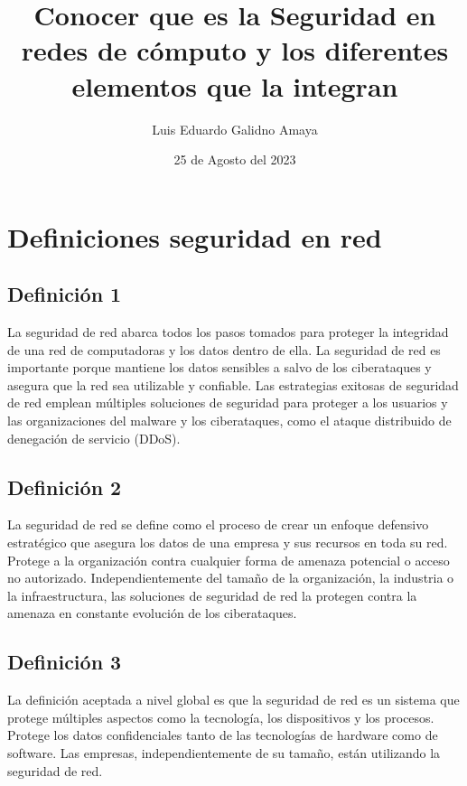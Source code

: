 \documentclass[11pt]{article}
\author{Luis Eduardo Galidno Amaya}
\date{25 de Agosto del 2023}
\title{Conocer que es la Seguridad en \\
redes de cómputo y los diferentes elementos que la integran}
\begin{document}


\section{Definiciones seguridad en red}
\label{sec:org6c4bf58}
\subsection{Definición 1}
\label{sec:orgaa7166d}
\autocite{barney_lutkevich_2022}  La seguridad de red abarca todos los pasos tomados para proteger la integridad de una red de computadoras y los datos dentro de ella. La seguridad de red es importante porque mantiene los datos sensibles a salvo de los ciberataques y asegura que la red sea utilizable y confiable. Las estrategias exitosas de seguridad de red emplean múltiples soluciones de seguridad para proteger a los usuarios y las organizaciones del malware y los ciberataques, como el ataque distribuido de denegación de servicio (DDoS).

\subsection{Definición 2}
\label{sec:orgd6f4f01}
\autocite{Prabhu_24_2021} La seguridad de red se define como el proceso de crear un enfoque defensivo estratégico que asegura los datos de una empresa y sus recursos en toda su red. Protege a la organización contra cualquier forma de amenaza potencial o acceso no autorizado. Independientemente del tamaño de la organización, la industria o la infraestructura, las soluciones de seguridad de red la protegen contra la amenaza en constante evolución de los ciberataques.

\subsection{Definición 3}
\label{sec:org4b47779}
\autocite{Naz_2023} La definición aceptada a nivel global es que la seguridad de red es un sistema que protege múltiples aspectos como la tecnología, los dispositivos y los procesos. Protege los datos confidenciales tanto de las tecnologías de hardware como de software. Las empresas, independientemente de su tamaño, están utilizando la seguridad de red.
\end{document}
